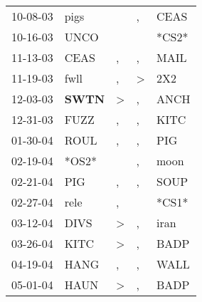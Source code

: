 \begin{supertabular}{p{0.07\textwidth}p{0.06\textwidth}p{0.02\textwidth}p{0.02\textwidth}p{0.06\textwidth}}
          10-08-03\textsuperscript{} &           pigs\textsuperscript{} &                  &                , &           CEAS\textsuperscript{} \\
          10-16-03\textsuperscript{} &           UNCO\textsuperscript{} &                  &                  &                            *CS2* \\
          11-13-03\textsuperscript{} &           CEAS\textsuperscript{} &                , &                , &           MAIL\textsuperscript{} \\
          11-19-03\textsuperscript{} &           fwll\textsuperscript{} &                , &     \textgreater &            2X2\textsuperscript{} \\
          12-03-03\textsuperscript{} &  \textbf{SWTN\textsuperscript{}} &     \textgreater &                , &           ANCH\textsuperscript{} \\
          12-31-03\textsuperscript{} &           FUZZ\textsuperscript{} &                , &                , &           KITC\textsuperscript{} \\
          01-30-04\textsuperscript{} &           ROUL\textsuperscript{} &                , &                , &            PIG\textsuperscript{} \\
          02-19-04\textsuperscript{} &                            *OS2* &                  &                , &           moon\textsuperscript{} \\
          02-21-04\textsuperscript{} &            PIG\textsuperscript{} &                , &                , &           SOUP\textsuperscript{} \\
          02-27-04\textsuperscript{} &           rele\textsuperscript{} &                , &                  &                            *CS1* \\
          03-12-04\textsuperscript{} &           DIVS\textsuperscript{} &     \textgreater &                , &           iran\textsuperscript{} \\
          03-26-04\textsuperscript{} &           KITC\textsuperscript{} &     \textgreater &                , &           BADP\textsuperscript{} \\
          04-19-04\textsuperscript{} &           HANG\textsuperscript{} &                , &                , &           WALL\textsuperscript{} \\
          05-01-04\textsuperscript{} &           HAUN\textsuperscript{} &     \textgreater &                , &           BADP\textsuperscript{} \\

\end{supertabular}
